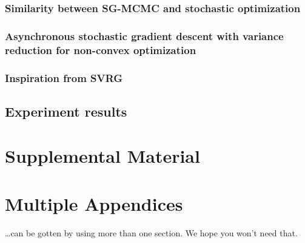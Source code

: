 \documentclass[11pt,a4paper]{article}
\begin{document}
\subsubsection{Similarity between SG-MCMC and stochastic optimization}
\subsubsection{Asynchronous stochastic gradient descent with variance reduction for non-convex optimization}
\subsubsection{Inspiration from SVRG}
\subsection{Experiment results}




\appendix

\section{Supplemental Material}
\label{sec:supplemental}

\section{Multiple Appendices}
\dots can be gotten by using more than one section. We hope you won't
need that.
\end{document}

